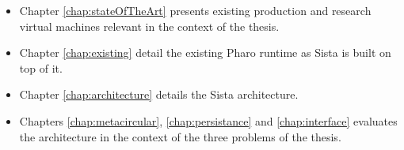\documentclass[a4paper,12pt,twoside]{../includes/ThesisStyle}
\begin{document}
\begin{itemize}
	\item Chapter \ref{chap:stateOfTheArt} presents existing production and research virtual machines relevant in the context of the thesis. 
	\item Chapter \ref{chap:existing} detail the existing Pharo runtime as Sista is built on top of it.
	\item Chapter \ref{chap:architecture} details the Sista architecture. 
	\item Chapters \ref{chap:metacircular}, \ref{chap:persistance} and \ref{chap:interface} evaluates the architecture in the context of the three problems of the thesis.
\end{itemize}



\ifx\wholebook\relax\else
    
\end{document}
